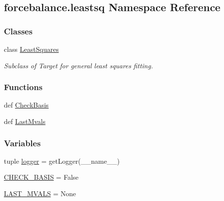\hypertarget{namespaceforcebalance_1_1leastsq}{\subsection{forcebalance.\-leastsq Namespace Reference}
\label{namespaceforcebalance_1_1leastsq}
}
\subsubsection*{Classes}
\begin{DoxyCompactItemize}
\item 
class \hyperlink{classforcebalance_1_1leastsq_1_1LeastSquares}{Least\-Squares}
\begin{DoxyCompactList}\small\item\em Subclass of Target for general least squares fitting. \end{DoxyCompactList}\end{DoxyCompactItemize}
\subsubsection*{Functions}
\begin{DoxyCompactItemize}
\item 
def \hyperlink{namespaceforcebalance_1_1leastsq_a8e7ef329e27aff738bc91dd79bd2dd1c}{Check\-Basis}
\item 
def \hyperlink{namespaceforcebalance_1_1leastsq_ad9d0036b0003e0245608ffb192c7c60c}{Last\-Mvals}
\end{DoxyCompactItemize}
\subsubsection*{Variables}
\begin{DoxyCompactItemize}
\item 
tuple \hyperlink{namespaceforcebalance_1_1leastsq_ab5873c70f3da934d9c5c78ca9c7ca8d0}{logger} = get\-Logger(\-\_\-\-\_\-name\-\_\-\-\_\-)
\item 
\hyperlink{namespaceforcebalance_1_1leastsq_a87815b7768ddc6d9caf7fa3c804fe303}{C\-H\-E\-C\-K\-\_\-\-B\-A\-S\-I\-S} = False
\item 
\hyperlink{namespaceforcebalance_1_1leastsq_a037a62063d126288c2df0f4e0cd5085a}{L\-A\-S\-T\-\_\-\-M\-V\-A\-L\-S} = None
\end{DoxyCompactItemize}


